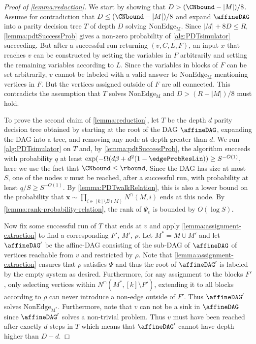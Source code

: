 {}{
\lemmareduction*
\begin{proof}[Proof of \autoref{lemma:reduction}]

        We start by showing that $D > (\CNbound-|M|)/8$. Assume for contradiction that $D \leq (\CNbound -|M|)/8$ and expand $\affineDAG$ into a parity decision tree $T$ of depth $D$ solving $\mathrm{NonEdge_M}$. Since $|M| + 8D \leq R$, \autoref{lemma:pdtSuccessProb} gives a non-zero probability of \autoref{alg:PDTsimulator} succeeding. But after a successful run returning $(v, C,L,F)$, an input $x$ that reaches $v$ can be constructed by setting the variables in $F$ arbitrarily and setting the remaining variables according to $L$. Since the variables in blocks of $F$ can be set arbitrarily, $v$ cannot be labeled with a valid answer to $\mathrm{NonEdge_M}$ mentioning vertices in $F$. But the vertices assigned outside of $F$ are all connected. This contradicts the assumption that $T$ solves $\mathrm{NonEdge_M}$ and $D>(R-|M|)/8$ must hold. 
        
        To prove the second claim of \autoref{lemma:reduction}, let $T$ be the depth $d$ parity decision tree obtained by starting at the root of the DAG $\affineDAG$, expanding the DAG into a tree, and removing any node at depth greater than $d$. We run \autoref{alg:PDTsimulator} on $T$ and, by \autoref{lemma:pdtSuccessProb}, the algorithm succeeds with probability $q$ at least $\exp(-\Omega(d\beta+d^2(1-\edgeProbResLin))\geq S^{-O(1)}$, here we use the fact that $\CNbound\leq \rbound$. Since the DAG has size at most $S$, one of the nodes $v$ must be reached, after a successful run, with probability at least $q/S \geq S^{-O(1)}$.
        By \autoref{lemma:PDTwalkRelation}, this is also a lower bound on the probability that $\bm x \sim \prod_{i \in [k] \setminus B(M)} N^\cap(M,i)$ ends at this node. By \autoref{lemma:rank-probability-relation}, the rank of $\Psi_v$ is bounded by $O(\log S)$. 

        Now fix some successful run of $T$ that ends at $v$ and apply \autoref{lemma:assignment-extraction} to find a corresponding $F'$, $M'$, $\rho$. Let $M^* = M\cup M'$ and let $\affineDAG'$ be the affine-DAG consisting of the sub-DAG of $\affineDAG$ of vertices reachable from $v$ and restricted by $\rho$. Note that \autoref{lemma:assignment-extraction} ensures that $\rho$ satisfies $\Psi$ and thus the root of $\affineDAG'$ is labeled by the empty system as desired. Furthermore, for any assignment to the blocks $F'$, only selecting vertices within $N^\cap(M^*,[k]\setminus F')$, extending it to all blocks according to $\rho$ can never introduce a non-edge outside of $F'$. Thus $\affineDAG'$ solves $\mathrm{NonEdge_{M^*}}$. Furthermore, note that $v$ can not be a sink in $\affineDAG$ since $\affineDAG'$ solves a non-trivial problem. Thus $v$ must have been reached after exactly $d$ steps in $T$ which means that $\affineDAG'$ cannot have depth higher than $D-d$.
       
\end{proof}
}


